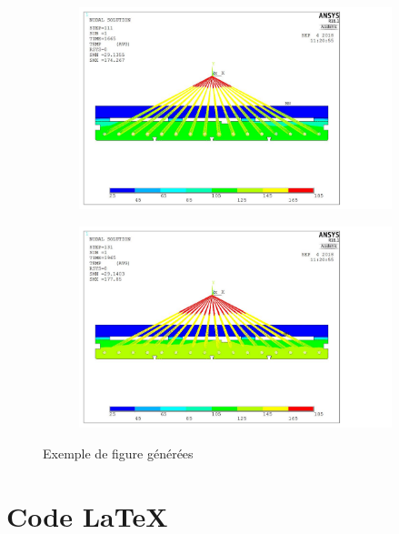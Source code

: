 \documentclass[a4paper,12pt]{report}
\begin{document}
\begin{figure}[hbtp]
\begin{subfigure}[b]{0.25\textwidth}
	\end{subfigure}
	\qquad
	\begin{subfigure}[b]{0.25\textwidth}
		\centering
		\includegraphics[scale=0.12]{Figures/animation/Figure_13.pdf}
	\end{subfigure}
	\qquad
	\begin{subfigure}[b]{0.25\textwidth}
		\centering
		\includegraphics[scale=0.12]{Figures/animation/Figure_15.pdf}
	\end{subfigure}
	\caption{Exemple de figure générées} 
	\label{figure_deux_logo_SYMME}
\end{figure}


\FloatBarrier

\section{Code \LaTeX}
\end{document}
